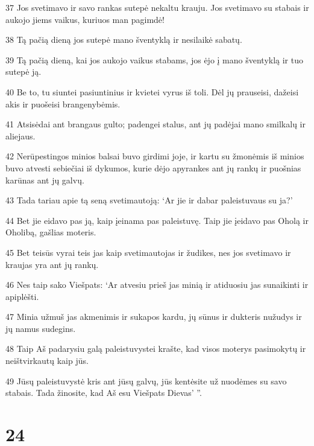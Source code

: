 \par 37 Jos svetimavo ir savo rankas sutepė nekaltu krauju. Jos svetimavo su stabais ir aukojo jiems vaikus, kuriuos man pagimdė! 
\par 38 Tą pačią dieną jos sutepė mano šventyklą ir nesilaikė sabatų. 
\par 39 Tą pačią dieną, kai jos aukojo vaikus stabams, jos ėjo į mano šventyklą ir tuo sutepė ją. 
\par 40 Be to, tu siuntei pasiuntinius ir kvietei vyrus iš toli. Dėl jų prauseisi, dažeisi akis ir puošeisi brangenybėmis. 
\par 41 Atsisėdai ant brangaus gulto; padengei stalus, ant jų padėjai mano smilkalų ir aliejaus. 
\par 42 Nerūpestingos minios balsai buvo girdimi joje, ir kartu su žmonėmis iš minios buvo atvesti sebiečiai iš dykumos, kurie dėjo apyrankes ant jų rankų ir puošnias karūnas ant jų galvų. 
\par 43 Tada tariau apie tą seną svetimautoją: ‘Ar jie ir dabar paleistuvaus su ja?’ 
\par 44 Bet jie eidavo pas ją, kaip įeinama pas paleistuvę. Taip jie įeidavo pas Oholą ir Oholibą, gašlias moteris. 
\par 45 Bet teisūs vyrai teis jas kaip svetimautojas ir žudikes, nes jos svetimavo ir kraujas yra ant jų rankų. 
\par 46 Nes taip sako Viešpats: ‘Ar atvesiu prieš jas minią ir atiduosiu jas sunaikinti ir apiplėšti. 
\par 47 Minia užmuš jas akmenimis ir sukapos kardu, jų sūnus ir dukteris nužudys ir jų namus sudegins. 
\par 48 Taip Aš padarysiu galą paleistuvystei krašte, kad visos moterys pasimokytų ir neištvirkautų kaip jūs. 
\par 49 Jūsų paleistuvystė kris ant jūsų galvų, jūs kentėsite už nuodėmes su savo stabais. Tada žinosite, kad Aš esu Viešpats Dievas’ ”.



\chapter{24}


